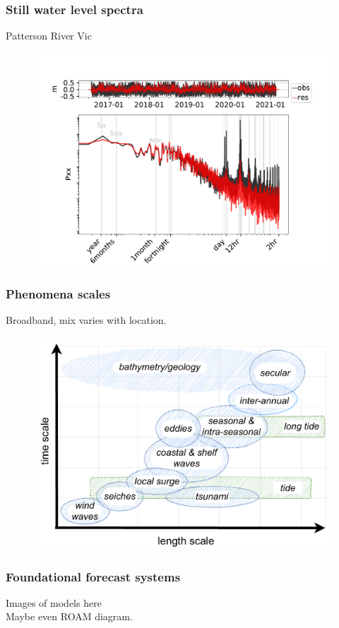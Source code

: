 \begin{frame}
\frametitle{Still water level spectra}
Patterson River Vic
\begin{minipage}{1.0\textwidth}
    \begin{figure}      
    \includegraphics[height=0.8\textheight]{figures/plots/586204_verify_Pxx.pdf}
    \end{figure}
\end{minipage}
\end{frame}
\begin{frame}
\frametitle{Phenomena scales}
Broadband, mix varies with location.
    \begin{figure}      
    \includegraphics[height=0.8\textheight]{figures/diagrams/scales_time_length.pdf}
    \end{figure}
\end{frame}
\begin{frame}
\frametitle{Foundational forecast systems}
    Images of models here\\
    Maybe even ROAM diagram.
\end{frame}

